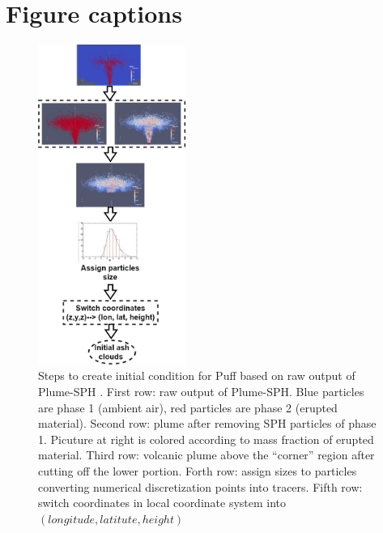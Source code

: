 \documentclass[utf8]{frontiersSCNS} %
\begin{document}




\section*{Figure captions}
\begin{figure}
\center
\includegraphics[width=0.43\textwidth]{Figures/Creat_initial_Ash}
\caption{Steps to create initial condition for Puff based on raw output of Plume-SPH \citep{cao2018plume}. First row: raw output of Plume-SPH. Blue particles are phase 1 (ambient air), red particles are phase 2 (erupted material). Second row: plume after removing SPH particles of phase 1. Picuture at right is colored according to mass fraction of erupted material. Third row: volcanic plume above the ``corner'' region after cutting off the lower portion. Forth row: assign sizes to particles converting numerical discretization points into tracers. Fifth row: switch coordinates in local coordinate system into $(longitude, latitute, height)$}
\label{fig:create-initial-ash-plume-sph}
\end{figure}
\end{document}

